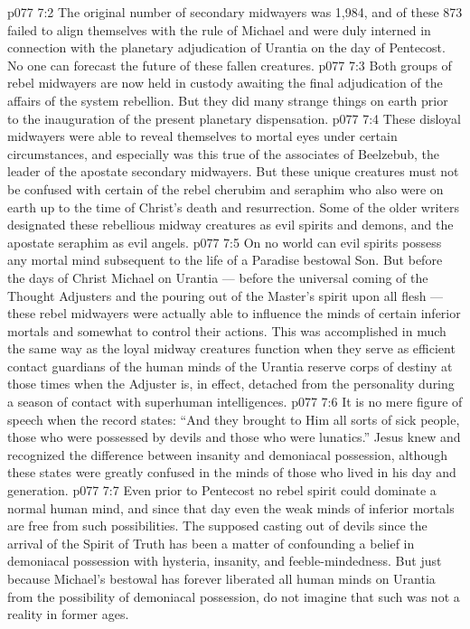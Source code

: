 \vs p077 7:2 The original number of secondary midwayers was 1,984, and of these 873 failed to align themselves with the rule of Michael and were duly interned in connection with the planetary adjudication of Urantia on the day of Pentecost. No one can forecast the future of these fallen creatures.
\vs p077 7:3 Both groups of rebel midwayers are now held in custody awaiting the final adjudication of the affairs of the system rebellion. But they did many strange things on earth prior to the inauguration of the present planetary dispensation.
\vs p077 7:4 These disloyal midwayers were able to reveal themselves to mortal eyes under certain circumstances, and especially was this true of the associates of Beelzebub, the leader of the apostate secondary midwayers. But these unique creatures must not be confused with certain of the rebel cherubim and seraphim who also were on earth up to the time of Christ’s death and resurrection. Some of the older writers designated these rebellious midway creatures as evil spirits and demons, and the apostate seraphim as evil angels.
\vs p077 7:5 On no world can evil spirits possess any mortal mind subsequent to the life of a Paradise bestowal Son. But before the days of Christ Michael on Urantia --- before the universal coming of the Thought Adjusters and the pouring out of the Master’s spirit upon all flesh --- these rebel midwayers were actually able to influence the minds of certain inferior mortals and somewhat to control their actions. This was accomplished in much the same way as the loyal midway creatures function when they serve as efficient contact guardians of the human minds of the Urantia reserve corps of destiny at those times when the Adjuster is, in effect, detached from the personality during a season of contact with superhuman intelligences.
\vs p077 7:6 It is no mere figure of speech when the record states: “And they brought to Him all sorts of sick people, those who were possessed by devils and those who were lunatics.” Jesus knew and recognized the difference between insanity and demoniacal possession, although these states were greatly confused in the minds of those who lived in his day and generation.
\vs p077 7:7 Even prior to Pentecost no rebel spirit could dominate a normal human mind, and since that day even the weak minds of inferior mortals are free from such possibilities. The supposed casting out of devils since the arrival of the Spirit of Truth has been a matter of confounding a belief in demoniacal possession with hysteria, insanity, and feeble\hyp{}mindedness. But just because Michael’s bestowal has forever liberated all human minds on Urantia from the possibility of demoniacal possession, do not imagine that such was not a reality in former ages.
